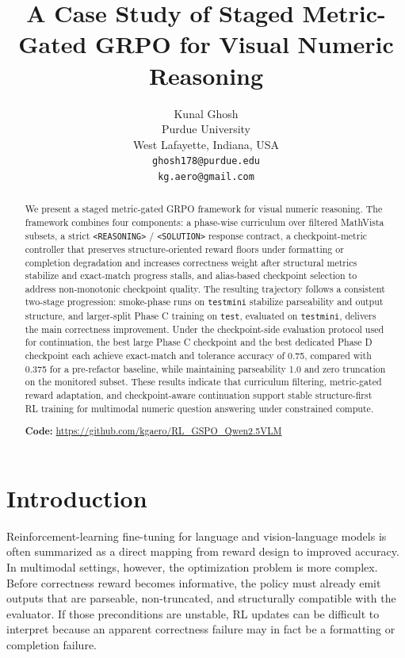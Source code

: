 \documentclass{article} %
\title{A Case Study of Staged Metric-Gated GRPO for Visual Numeric Reasoning}
\author{Kunal Ghosh\\
Purdue University\\
West Lafayette, Indiana, USA\\
\texttt{ghosh178@purdue.edu}\\
\texttt{kg.aero@gmail.com}}
\begin{document}
\maketitle
\fancyhead{}
\lhead{}
\chead{}
\rhead{}

\begin{abstract}
We present a staged metric-gated GRPO framework for visual numeric reasoning. The framework combines four components: a phase-wise curriculum over filtered MathVista subsets, a strict \texttt{<REASONING>} / \texttt{<SOLUTION>} response contract, a checkpoint-metric controller that preserves structure-oriented reward floors under formatting or completion degradation and increases correctness weight after structural metrics stabilize and exact-match progress stalls, and alias-based checkpoint selection to address non-monotonic checkpoint quality. The resulting trajectory follows a consistent two-stage progression: smoke-phase runs on \texttt{testmini} stabilize parseability and output structure, and larger-split Phase C training on \texttt{test}, evaluated on \texttt{testmini}, delivers the main correctness improvement. Under the checkpoint-side evaluation protocol used for continuation, the best large Phase C checkpoint and the best dedicated Phase D checkpoint each achieve exact-match and tolerance accuracy of 0.75, compared with 0.375 for a pre-refactor baseline, while maintaining parseability 1.0 and zero truncation on the monitored subset. These results indicate that curriculum filtering, metric-gated reward adaptation, and checkpoint-aware continuation support stable structure-first RL training for multimodal numeric question answering under constrained compute.

\textbf{Code:} \url{https://github.com/kgaero/RL_GSPO_Qwen2.5VLM}
\end{abstract}

\section{Introduction}

Reinforcement-learning fine-tuning for language and vision-language models is often summarized as a direct mapping from reward design to improved accuracy. In multimodal settings, however, the optimization problem is more complex. Before correctness reward becomes informative, the policy must already emit outputs that are parseable, non-truncated, and structurally compatible with the evaluator. If those preconditions are unstable, RL updates can be difficult to interpret because an apparent correctness failure may in fact be a formatting or completion failure.
\end{document}
